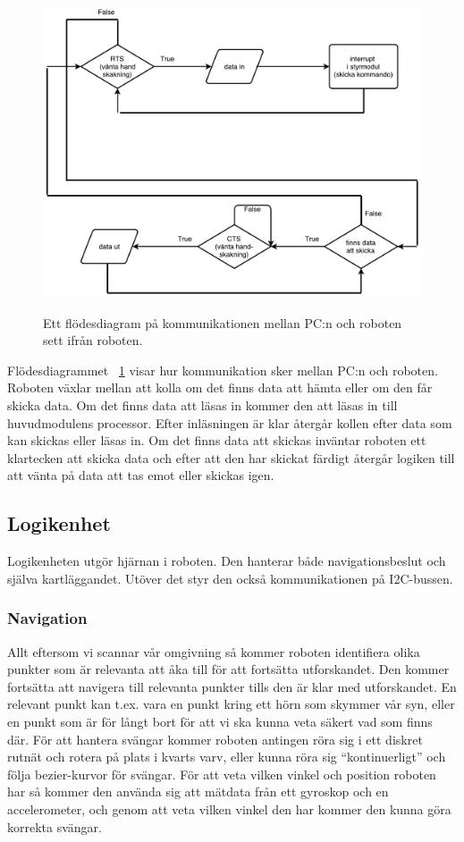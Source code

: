 \documentclass{article}
\begin{document}
\begin{figure}[H]
  \centering
  \includegraphics[scale=0.44]{Bluetooth_kommunikation_i_robot} \\
  \caption{Ett flödesdiagram på kommunikationen mellan PC:n och roboten sett ifrån roboten.}
  \label{fig:Bluetooth}
\end{figure}
Flödesdiagrammet ~\ref{fig:Bluetooth} visar hur kommunikation sker mellan PC:n och roboten. Roboten växlar mellan att kolla om det finns data att hämta eller om den får skicka data. Om det finns data att läsas in kommer den att läsas in till huvudmodulens processor. Efter inläsningen är klar återgår kollen efter data som kan skickas eller läsas in. Om det finns data att skickas inväntar roboten ett klartecken att skicka data och efter att den har skickat färdigt återgår logiken till att vänta på data att tas emot eller skickas igen. 

\subsection{Logikenhet}
Logikenheten utgör hjärnan i roboten. Den hanterar både navigationsbeslut och själva kartläggandet. Utöver det styr den också kommunikationen på I2C-bussen.

\subsubsection{Navigation}
Allt eftersom vi scannar vår omgivning så kommer roboten identifiera olika punkter som är relevanta att åka till för att fortsätta utforskandet. Den kommer fortsätta att navigera till relevanta punkter tills den är klar med utforskandet. En relevant punkt kan t.ex. vara en punkt kring ett hörn som skymmer vår syn, eller en punkt som är för långt bort för att vi ska kunna veta säkert vad som finns där. För att hantera svängar kommer roboten antingen röra sig i ett diskret rutnät och rotera på plats i kvarts varv, eller kunna röra sig ``kontinuerligt'' och följa bezier-kurvor för svängar. För att veta vilken vinkel och position roboten har så kommer den använda sig att mätdata från ett gyroskop och en accelerometer, och genom att veta vilken vinkel den har kommer den kunna göra korrekta svängar.
\end{document}
